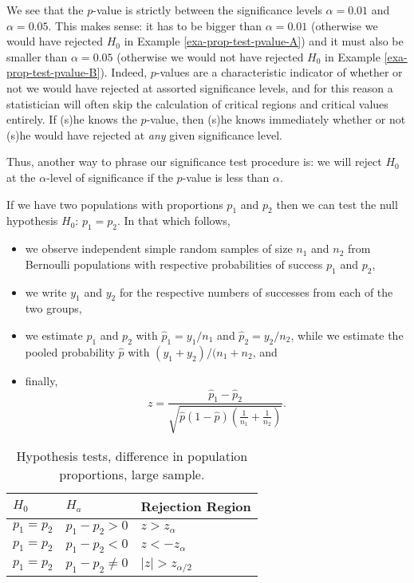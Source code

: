 We see that the \(p\)-value is strictly between the significance
levels \(\alpha = 0.01\) and \(\alpha = 0.05\). This makes sense: it
has to be bigger than \(\alpha = 0.01\) (otherwise we would have
rejected \(H_{0}\) in Example \ref{exa-prop-test-pvalue-A}) and it must also
be smaller than \(\alpha = 0.05\) (otherwise we would not have
rejected \(H_{0}\) in Example \ref{exa-prop-test-pvalue-B}). Indeed,
\(p\)-values are a characteristic indicator of whether or not we would
have rejected at assorted significance levels, and for this reason a
statistician will often skip the calculation of critical regions and
critical values entirely. If (s)he knows the \(p\)-value, then (s)he
knows immediately whether or not (s)he would have rejected at \emph{any}
given significance level.

Thus, another way to phrase our significance test procedure is: we
will reject \(H_{0}\) at the \(\alpha\)-level of significance if the
\(p\)-value is less than \(\alpha\).

\begin{rem}
If we have two populations with proportions \(p_{1}\) and \(p_{2}\)
then we can test the null hypothesis \(H_{0}:\,p_{1} = p_{2}\). In
that which follows,
\begin{itemize}
\item we observe independent simple random samples of size \(n_{1}\) and
\(n_{2}\) from Bernoulli populations with respective probabilities
of success \(p_{1}\) and \(p_{2}\),
\item we write \(y_{1}\) and \(y_{2}\) for the respective numbers of
successes from each of the two groups,
\item we estimate \(p_{1}\) and \(p_{2}\) with \(\hat{p}_{1} = y_{1}/n_{1}
  \) and \(\hat{p}_{2} = y_{2}/n_{2}\), while we estimate the pooled
probability \(\hat{p}\) with \((y_{1} + y_{2})/(n_{1} + n_{2}\), and
\item finally, \[z = \frac{\hat{p}_{1} - \hat{p}_{2}}{\sqrt{\hat{p}(1 - \hat{p})\left( \frac{1}{n_{1}} + \frac{1}{n_{2}} \right)}}. \]
\end{itemize}
\end{rem}


\begin{table}[htb]
\caption[Hypothesis tests, difference in population proportions, large sample]{\label{tab-ztest-two-sample-prop}Hypothesis tests, difference in population proportions, large sample.}
\centering
\begin{tabular}{lll}
\(H_{0}\) & \(H_{a}\) & Rejection Region\\
\hline
\(p_{1} = p_{2}\) & \(p_{1} - p_{2} > 0\) & \(z > z_{\alpha}\)\\
\(p_{1} = p_{2}\) & \(p_{1} - p_{2} < 0\) & \(z < -z_{\alpha}\)\\
\(p_{1} = p_{2}\) & \(p_{1} - p_{2} \neq 0\) & \( \vert z \vert > z_{\alpha/2}\)\\
\end{tabular}
\end{table}


